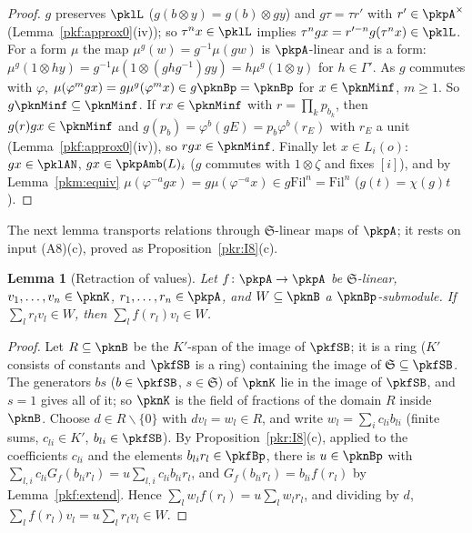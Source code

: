 \documentclass[10pt]{amsart}
\newtheorem{lemma}[theorem]{Lemma}
\theoremstyle{definition}
\theoremstyle{remark}
\begin{document}
\begin{proof}
$g$ preserves $\pklL$ ($g(b\otimes y)=g(b)\otimes gy$) and $g\tau=\tau r'$ with $r'\in\pkpA^\times$
(Lemma~\ref{pkf:approx0}(iv)); so $\tau^nx\in\pklL$ implies $\tau^ngx=r'^{-n}g(\tau^nx)\in\pklL$. For a form $\mu$
the map $\mu^g(w)=g^{-1}\mu(gw)$ is $\pkpA$-linear and is a form: $\mu^g(1\otimes hy)=g^{-1}\mu(1\otimes
(ghg^{-1})gy)=h\mu^g(1\otimes y)$ for $h\in\Gamma'$. As $g$ commutes with $\varphi$, $\mu(\varphi^mgx)=
g\mu^g(\varphi^mx)\in g\pknBp=\pknBp$ for $x\in\pknMinf$, $m\ge1$. So $g\pknMinf\subseteq\pknMinf$. If
$rx\in\pknMinf$ with $r=\prod_kp_{b_k}$, then $g(r)gx\in\pknMinf$ and $g(p_b)=\varphi^b(gE)=p_b\varphi^b(r_E)$ with
$r_E$ a unit (Lemma~\ref{pkf:approx0}(iv)), so $rgx\in\pknMinf$. Finally let $x\in L_i(o)$: $gx\in\pklAN$, $gx\in
\pkpAmb(L)_i$ ($g$ commutes with $1\otimes\zeta$ and fixes $[i]$), and by Lemma~\ref{pkm:equiv}
$\mu(\varphi^{-a}gx)=g\mu(\varphi^{-a}x)\in g\mathrm{Fil}^n=\mathrm{Fil}^n$ ($g(t)=\chi(g)t$).
\end{proof}

The next lemma transports relations through $\mathfrak S$-linear maps of $\pkpA$; it rests on input (A8)(c),
proved as Proposition~\ref{pkr:I8}(c).

\begin{lemma}[Retraction of values]\label{pkl:valret}
Let $f\colon\pkpA\to\pkpA$ be $\mathfrak S$-linear, $v_1,\dots,v_n\in\pknK$, $r_1,\dots,r_n\in\pkpA$, and $W\subseteq
\pknB$ a $\pknBp$-submodule. If $\sum_lr_lv_l\in W$, then $\sum_lf(r_l)v_l\in W$.
\end{lemma}

\begin{proof}
Let $R\subseteq\pknB$ be the $K'$-span of the image of $\pkfSB$; it is a ring ($K'$ consists of constants and
$\pkfSB$ is a ring) containing the image of $\mathfrak S\subseteq\pkfSB$. The generators $bs$ ($b\in\pkfSB$,
$s\in\mathfrak S$) of $\pknK$ lie in the image of $\pkfSB$, and $s=1$ gives all of it; so $\pknK$ is the field of
fractions of the domain $R$ inside $\pknB$. Choose $d\in R\smallsetminus\{0\}$ with $dv_l=w_l\in R$, and write
$w_l=\sum_ic_{li}b_{li}$ (finite sums, $c_{li}\in K'$, $b_{li}\in\pkfSB$). By Proposition~\ref{pkr:I8}(c), applied to
the coefficients $c_{li}$ and the elements $b_{li}r_l\in\pkfBp$, there is $u\in\pknBp$ with $\sum_{l,i}c_{li}
G_f(b_{li}r_l)=u\sum_{l,i}c_{li}b_{li}r_l$, and $G_f(b_{li}r_l)=b_{li}f(r_l)$ by Lemma~\ref{pkf:extend}. Hence
$\sum_lw_lf(r_l)=u\sum_lw_lr_l$, and dividing by $d$, $\sum_lf(r_l)v_l=u\sum_lr_lv_l\in W$.
\end{proof}
\end{document}
